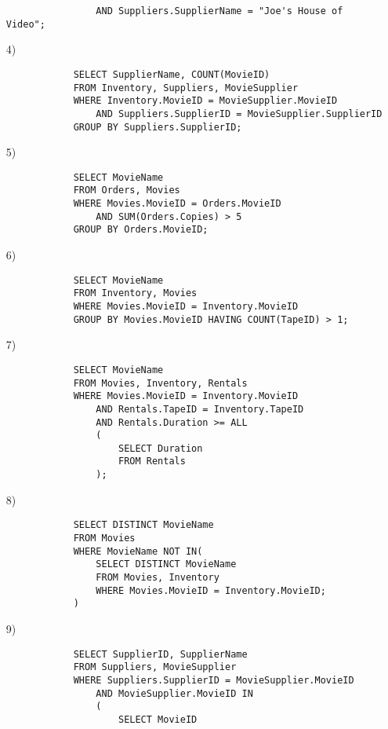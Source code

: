 \documentclass[10pt,a4paper]{article}
\begin{document}
\begin{enumerate}
\begin{verbatim}
                AND Suppliers.SupplierName = "Joe's House of Video";
        \end{verbatim}
        \item[4)]\begin{verbatim}
            SELECT SupplierName, COUNT(MovieID)
            FROM Inventory, Suppliers, MovieSupplier
            WHERE Inventory.MovieID = MovieSupplier.MovieID
                AND Suppliers.SupplierID = MovieSupplier.SupplierID
            GROUP BY Suppliers.SupplierID;
        \end{verbatim}
        \item[5)]\begin{verbatim}
            SELECT MovieName
            FROM Orders, Movies
            WHERE Movies.MovieID = Orders.MovieID
                AND SUM(Orders.Copies) > 5
            GROUP BY Orders.MovieID;
        \end{verbatim}
        \item[6)]\begin{verbatim}
            SELECT MovieName
            FROM Inventory, Movies
            WHERE Movies.MovieID = Inventory.MovieID
            GROUP BY Movies.MovieID HAVING COUNT(TapeID) > 1;
        \end{verbatim}
        \item[7)]\begin{verbatim}
            SELECT MovieName
            FROM Movies, Inventory, Rentals
            WHERE Movies.MovieID = Inventory.MovieID
                AND Rentals.TapeID = Inventory.TapeID
                AND Rentals.Duration >= ALL 
                (
                    SELECT Duration
                    FROM Rentals
                );
        \end{verbatim}
        \item[8)]\begin{verbatim}
            SELECT DISTINCT MovieName
            FROM Movies
            WHERE MovieName NOT IN(
                SELECT DISTINCT MovieName
                FROM Movies, Inventory
                WHERE Movies.MovieID = Inventory.MovieID;
            )
        \end{verbatim}
        \item[9)]\begin{verbatim}
            SELECT SupplierID, SupplierName
            FROM Suppliers, MovieSupplier
            WHERE Suppliers.SupplierID = MovieSupplier.MovieID
                AND MovieSupplier.MovieID IN
                (
                    SELECT MovieID

\end{verbatim}
\end{enumerate}
\end{document}
